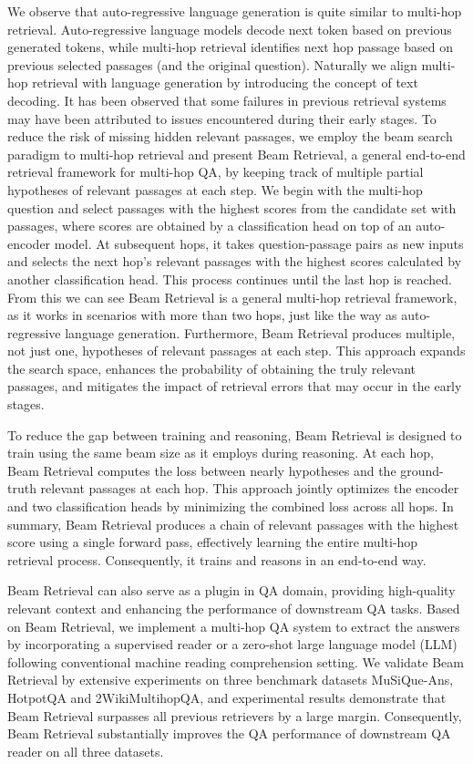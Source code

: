 \documentclass[10.5pt]{article}
\begin{document}
We observe that auto-regressive language generation is quite similar to multi-hop retrieval. Auto-regressive language models \cite{gpt1,t5,bart} decode next token based on previous generated tokens, while multi-hop retrieval identifies next hop passage based on previous selected passages (and the original question). Naturally we align multi-hop retrieval with language generation by introducing the concept of text decoding. It has been observed that some failures in previous retrieval systems may have been attributed to issues encountered during their early stages. To reduce the risk of missing hidden relevant passages, we employ the beam search paradigm to multi-hop retrieval and present Beam Retrieval, a general end-to-end retrieval framework for multi-hop QA, by keeping track of multiple partial hypotheses of relevant passages at each step. We begin with the multi-hop question and select  passages with the highest scores from the candidate set with  passages, where scores are obtained by a classification head on top of an auto-encoder model. At subsequent hops, it takes  question-passage pairs as new inputs and selects the next hop's  relevant passages with the highest scores calculated by another classification head. This process continues until the last hop is reached. From this we can see Beam Retrieval is a general multi-hop retrieval framework, as it works in scenarios with more than two hops, just like the way as auto-regressive language generation. Furthermore, Beam Retrieval produces multiple, not just one, hypotheses of relevant passages at each step. This approach expands the search space, enhances the probability of obtaining the truly relevant passages, and mitigates the impact of retrieval errors that may occur in the early stages. 

To reduce the gap between training and reasoning, Beam Retrieval is designed to train using the same beam size  as it employs during reasoning. At each hop, Beam Retrieval computes the loss between nearly  hypotheses and the ground-truth relevant passages at each hop. This approach jointly optimizes the encoder and two classification heads by minimizing the combined loss across all hops. In summary, Beam Retrieval produces a chain of relevant passages with the highest score using a single forward pass, effectively learning the entire multi-hop retrieval process. Consequently, it trains and reasons in an end-to-end way.


Beam Retrieval can also serve as a plugin in QA domain, providing high-quality relevant context and enhancing the performance of downstream QA tasks. Based on Beam Retrieval, we implement a multi-hop QA system to extract the answers by incorporating a supervised reader \cite{DBLP:journals/corr/abs-2205-11729, DBLP:journals/corr/abs-2212-09512} or a zero-shot large language model (LLM) \cite{gpt3, gpt4} following conventional machine reading comprehension setting. We validate Beam Retrieval by extensive experiments on three benchmark datasets MuSiQue-Ans, HotpotQA and 2WikiMultihopQA, and experimental results demonstrate that Beam Retrieval surpasses all previous retrievers by a large margin. Consequently, Beam Retrieval substantially improves the QA performance of downstream QA reader on all three datasets.
\end{document}
